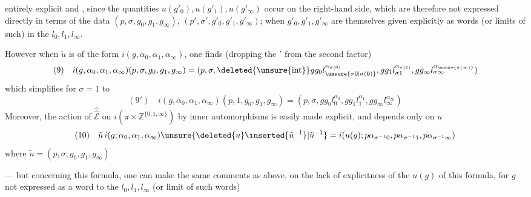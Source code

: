 entirely explicit and , since the quantities $u(g'_0),u(g'_1),u(g'_\infty)$ occur on the right-hand side, which are therefore not expressed directly in terms of the  data $(p,\sigma,g_0,g_1,g_\infty)$, $(p',\sigma',g'_0,g'_1,g'_\infty)$;  when $g'_0,g'_1,g'_\infty$ are themselves given explicitly as words (or limits of such) in the $l_0,l_1,l_\infty$.

However when $\tilde u$ is of the form $i(g,\alpha_0,\alpha_1,\alpha_\infty)$, one finds (dropping the $'$ from the second factor)
\[
(9)\quad i(g,\alpha_0,\alpha_1,\alpha_\infty)(p,\sigma,g_0,g_1,g_\infty)=(p,\sigma,\deleted{\unsure{\operatorname{int}}}gg_0l_{\unsure{\sigma0|\sigma(0)}}^{\alpha_{\sigma(0)}},gg_1l_{\sigma1}^{\alpha_{\sigma(1)}},gg_\infty l_{\sigma\infty}^{\alpha_{\unsure{\sigma(\infty)}}})
\]
which simplifies for $\sigma=1$ to
\[
(9')\quad i(g,\alpha_0,\alpha_1,\alpha_\infty)(p,1,g_0,g_1,g_\infty)=(p,\sigma,gg_0l_0^{\alpha_0},gg_1l_1^{\alpha_1},gg_\infty l_\infty^{\alpha_\infty})
\]
Moreover, the action of $\widehat{\widehat{\mathcal E}}$ on $i(\pi\times\mathbb Z^{\{0,1,\infty\}})$ by inner automorphisms is easily made explicit, and depends only on $u$ 
\[
(10)\quad\tilde u\,i(g;\alpha_0,\alpha_1,\alpha_\infty)\unsure{\deleted{u}\inserted{\tilde u^{-1}}|\tilde u^{-1}}=i(u(g);p\alpha_{\sigma^{-1}0},p\alpha_{\sigma^{-1}1},p\alpha_{\sigma^{-1}\infty})
\]
where $\tilde u=(p,\sigma;g_0,g_1,g_\infty)$

--- but concerning this formula, one can make the same comments as above, on the lack of explicitness of the  $u(g)$ of this formula, for $g$ not expressed as a word  to the $l_0,l_1,l_\infty$ (or limit of such words)

